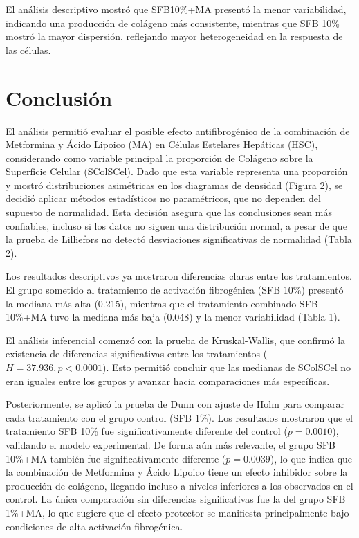 \documentclass[
  11pt,
]{article}
\begin{document}
El análisis descriptivo mostró que SFB10\%+MA presentó la menor
variabilidad, indicando una producción de colágeno más consistente,
mientras que SFB 10\% mostró la mayor dispersión, reflejando mayor
heterogeneidad en la respuesta de las células.

\newpage

\section{Conclusión}\label{conclusiuxf3n}

El análisis permitió evaluar el posible efecto antifibrogénico de la
combinación de Metformina y Ácido Lipoico (MA) en Células Estelares
Hepáticas (HSC), considerando como variable principal la proporción de
Colágeno sobre la Superficie Celular (SColSCel). Dado que esta variable
representa una proporción y mostró distribuciones asimétricas en los
diagramas de densidad (Figura 2), se decidió aplicar métodos
estadísticos no paramétricos, que no dependen del supuesto de
normalidad. Esta decisión asegura que las conclusiones sean más
confiables, incluso si los datos no siguen una distribución normal, a
pesar de que la prueba de Lilliefors no detectó desviaciones
significativas de normalidad (Tabla 2).

Los resultados descriptivos ya mostraron diferencias claras entre los
tratamientos. El grupo sometido al tratamiento de activación fibrogénica
(SFB 10\%) presentó la mediana más alta (0.215), mientras que el
tratamiento combinado SFB 10\%+MA tuvo la mediana más baja (0.048) y la
menor variabilidad (Tabla 1).

El análisis inferencial comenzó con la prueba de Kruskal-Wallis, que
confirmó la existencia de diferencias significativas entre los
tratamientos (\(H = 37.936, p < 0.0001\)). Esto permitió concluir que
las medianas de SColSCel no eran iguales entre los grupos y avanzar
hacia comparaciones más específicas.

Posteriormente, se aplicó la prueba de Dunn con ajuste de Holm para
comparar cada tratamiento con el grupo control (SFB 1\%). Los resultados
mostraron que el tratamiento SFB 10\% fue significativamente diferente
del control (\(p = 0.0010\)), validando el modelo experimental. De forma
aún más relevante, el grupo SFB 10\%+MA también fue significativamente
diferente (\(p = 0.0039\)), lo que indica que la combinación de
Metformina y Ácido Lipoico tiene un efecto inhibidor sobre la producción
de colágeno, llegando incluso a niveles inferiores a los observados en
el control. La única comparación sin diferencias significativas fue la
del grupo SFB 1\%+MA, lo que sugiere que el efecto protector se
manifiesta principalmente bajo condiciones de alta activación
fibrogénica.
\end{document}
